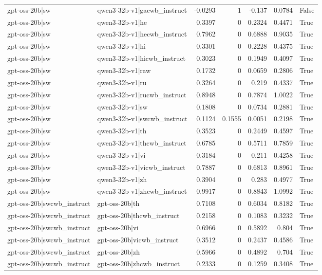 \begin{table}
\begin{tabular}{l l r r r r l}
gpt-oss-20b|sw & qwen3-32b-v1|gacwb_instruct & -0.0293 & 1 & -0.137 & 0.0784 & False \\
gpt-oss-20b|sw & qwen3-32b-v1|he & 0.3397 & 0 & 0.2324 & 0.4471 & True \\
gpt-oss-20b|sw & qwen3-32b-v1|hecwb_instruct & 0.7962 & 0 & 0.6888 & 0.9035 & True \\
gpt-oss-20b|sw & qwen3-32b-v1|hi & 0.3301 & 0 & 0.2228 & 0.4375 & True \\
gpt-oss-20b|sw & qwen3-32b-v1|hicwb_instruct & 0.3023 & 0 & 0.1949 & 0.4097 & True \\
gpt-oss-20b|sw & qwen3-32b-v1|raw & 0.1732 & 0 & 0.0659 & 0.2806 & True \\
gpt-oss-20b|sw & qwen3-32b-v1|ru & 0.3264 & 0 & 0.219 & 0.4337 & True \\
gpt-oss-20b|sw & qwen3-32b-v1|rucwb_instruct & 0.8948 & 0 & 0.7874 & 1.0022 & True \\
gpt-oss-20b|sw & qwen3-32b-v1|sw & 0.1808 & 0 & 0.0734 & 0.2881 & True \\
gpt-oss-20b|sw & qwen3-32b-v1|swcwb_instruct & 0.1124 & 0.1555 & 0.0051 & 0.2198 & True \\
gpt-oss-20b|sw & qwen3-32b-v1|th & 0.3523 & 0 & 0.2449 & 0.4597 & True \\
gpt-oss-20b|sw & qwen3-32b-v1|thcwb_instruct & 0.6785 & 0 & 0.5711 & 0.7859 & True \\
gpt-oss-20b|sw & qwen3-32b-v1|vi & 0.3184 & 0 & 0.211 & 0.4258 & True \\
gpt-oss-20b|sw & qwen3-32b-v1|vicwb_instruct & 0.7887 & 0 & 0.6813 & 0.8961 & True \\
gpt-oss-20b|sw & qwen3-32b-v1|zh & 0.3904 & 0 & 0.283 & 0.4977 & True \\
gpt-oss-20b|sw & qwen3-32b-v1|zhcwb_instruct & 0.9917 & 0 & 0.8843 & 1.0992 & True \\
gpt-oss-20b|swcwb_instruct & gpt-oss-20b|th & 0.7108 & 0 & 0.6034 & 0.8182 & True \\
gpt-oss-20b|swcwb_instruct & gpt-oss-20b|thcwb_instruct & 0.2158 & 0 & 0.1083 & 0.3232 & True \\
gpt-oss-20b|swcwb_instruct & gpt-oss-20b|vi & 0.6966 & 0 & 0.5892 & 0.804 & True \\
gpt-oss-20b|swcwb_instruct & gpt-oss-20b|vicwb_instruct & 0.3512 & 0 & 0.2437 & 0.4586 & True \\
gpt-oss-20b|swcwb_instruct & gpt-oss-20b|zh & 0.5966 & 0 & 0.4892 & 0.704 & True \\
gpt-oss-20b|swcwb_instruct & gpt-oss-20b|zhcwb_instruct & 0.2333 & 0 & 0.1259 & 0.3408 & True \\

\end{tabular}
\end{table}
